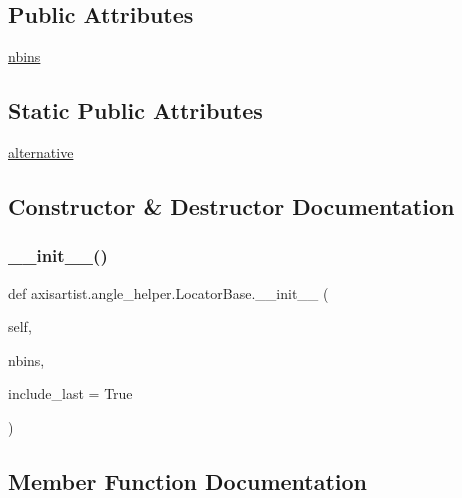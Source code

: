 \subsection*{Public Attributes}
\begin{DoxyCompactItemize}
\item 
\hyperlink{classaxisartist_1_1angle__helper_1_1LocatorBase_a195a74f763f1628601e498bd636ed5cd}{nbins}
\end{DoxyCompactItemize}
\subsection*{Static Public Attributes}
\begin{DoxyCompactItemize}
\item 
\hyperlink{classaxisartist_1_1angle__helper_1_1LocatorBase_a2d5b9461c11a0371bea290fe282caf8e}{alternative}
\end{DoxyCompactItemize}


\subsection{Constructor \& Destructor Documentation}
\mbox{\label{classaxisartist_1_1angle__helper_1_1LocatorBase_af802e7480e4264bde94c30c2630c95f3}} 
\subsubsection{\texorpdfstring{\+\_\+\+\_\+init\+\_\+\+\_\+()}{\_\_init\_\_()}}
{\footnotesize\ttfamily def axisartist.\+angle\+\_\+helper.\+Locator\+Base.\+\_\+\+\_\+init\+\_\+\+\_\+ (\begin{DoxyParamCaption}\item[{}]{self,  }\item[{}]{nbins,  }\item[{}]{include\+\_\+last = {\ttfamily True} }\end{DoxyParamCaption})}



\subsection{Member Function Documentation}
\mbox{\label{classaxisartist_1_1angle__helper_1_1LocatorBase_a7fc462cfc919459c9b88eabd7ab8b5c6}} 
